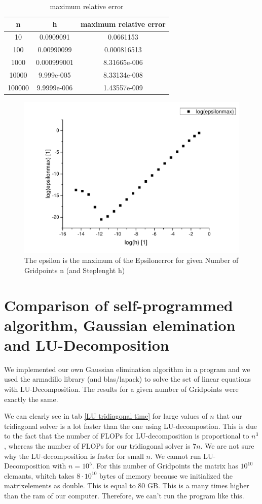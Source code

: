 \documentclass[10pt,a4paper]{article}
\begin{document}
\begin{table}
\centering
\caption{maximum relative error}
\label{max rel err}
\begin{tabular}{c|c|c}
n & h & maximum relative error\\
\hline\hline
10 & 0.0909091 & 0.0661153\\
100 & 0.00990099 & 0.000816513\\
1000 & 0.000999001 & 8.31665e-006\\
10000 & 9.999e-005 & 8.33134e-008\\
100000 & 9.9999e-006 & 1.43557e-009\\
\end{tabular}
\end{table}

\begin{figure}[h]
\centering
\includegraphics[scale=0.5]{epsilon_plot_log.pdf}
\caption{The epsilon is the maximum of the Epsilonerror for given Number of Gridpoints n (and Steplenght h) }
\label{linear plot}
\end{figure}

\section{Comparison of self-programmed algorithm, Gaussian elemination and LU-Decomposition }

We implemented our own Gaussian elimination algorithm in a program and we used the armadillo library (and blas/lapack) to solve the set of linear equations with LU-Decomposition. The results for a given number of Gridpoints were exactly the same. 

We can clearly see in tab \ref{LU tridiagonal time} for large values of $n$ that our tridiagonal solver is a lot faster than the one using LU-decompostion. This is due to the fact that the number of FLOPs for LU-decomposition is proportional to $n^3$, whereas the number of FLOPs for our tridiagonal solver is $7n$. We are not sure why the LU-decomposition is faster for small  $n$.
We cannot run LU-Decomposition with $n=10^{5}$. For this number of Gridpoints the matrix has $10^10$ elemants, whitch takes $8 \cdot 10^10$ bytes of memory because we initialized the matrixelements as double. This is equal to 80 GB. This is a many times higher than the ram of our computer. Therefore, we can't run the program like this. 
\end{document}
